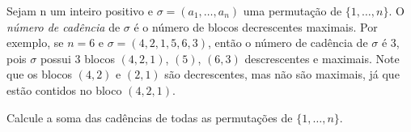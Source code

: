 Sejam n um inteiro positivo e $\sigma = (a_1, \dots, a_n)$ uma permutação de $\{1, \dots, n\}$. O \textit{número
de cadência} de $\sigma$ é o número de blocos decrescentes maximais. Por exemplo, se $n = 6$ e
$\sigma = (4, 2, 1, 5, 6, 3)$, então o número de cadência de $\sigma$ é $3$, pois $\sigma$ possui $3$ blocos $(4, 2, 1)$, $(5)$,
$(6, 3)$ descrescentes e maximais. Note que os blocos $(4, 2)$ e $(2, 1)$ são decrescentes, mas não
são maximais, já que estão contidos no bloco $(4, 2, 1)$.

Calcule a soma das cadências de todas as permutações de $\{1, \dots, n\}$.